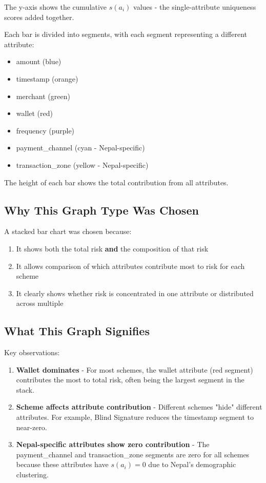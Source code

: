 \documentclass[12pt,a4paper,oneside,openany]{report}
\begin{document}
The y-axis shows the cumulative $s(a_i)$ values - the single-attribute uniqueness scores added together.

Each bar is divided into segments, with each segment representing a different attribute:
\begin{itemize}
    \item amount (blue)
    \item timestamp (orange)
    \item merchant (green)
    \item wallet (red)
    \item frequency (purple)
    \item payment\_channel (cyan - Nepal-specific)
    \item transaction\_zone (yellow - Nepal-specific)
\end{itemize}

The height of each bar shows the total contribution from all attributes.

\subsection{Why This Graph Type Was Chosen}
A stacked bar chart was chosen because:
\begin{enumerate}
    \item It shows both the total risk \textbf{and} the composition of that risk
    \item It allows comparison of which attributes contribute most to risk for each scheme
    \item It clearly shows whether risk is concentrated in one attribute or distributed across multiple
\end{enumerate}

\subsection{What This Graph Signifies}
Key observations:
\begin{enumerate}
    \item \textbf{Wallet dominates} - For most schemes, the wallet attribute (red segment) contributes the most to total risk, often being the largest segment in the stack.
    \item \textbf{Scheme affects attribute contribution} - Different schemes "hide" different attributes. For example, Blind Signature reduces the timestamp segment to near-zero.
    \item \textbf{Nepal-specific attributes show zero contribution} - The payment\_channel and transaction\_zone segments are zero for all schemes because these attributes have $s(a_i) = 0$ due to Nepal's demographic clustering.
\end{enumerate}
\end{document}
